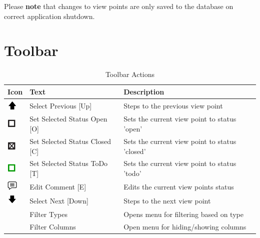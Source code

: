 Please \textbf{note} that changes to view points are only saved to the database on correct application shutdown.

\section{Toolbar}

\begin{table}[H]
  \center
  \begin{tabular}{ | l | l | l |}
    \hline
    \textbf{Icon} & \textbf{Text} &  \textbf{Description} \\ \hline
    \includegraphics[width=0.5cm,frame]{../../data/icons/up.png} & Select Previous [Up] & Steps to the previous view point \\ \hline
    \includegraphics[width=0.5cm,frame]{../../data/icons/not_recommended.png} & Set Selected Status Open [O] & Sets the current view point to status 'open' \\ \hline
    \includegraphics[width=0.5cm,frame]{../../data/icons/not_todo.png} & Set Selected Status Closed [C] & Sets the current view point to status 'closed' \\ \hline
    \includegraphics[width=0.5cm,frame]{../../data/icons/todo.png} & Set Selected Status ToDo [T] & Sets the current view point to status 'todo' \\ \hline
    \includegraphics[width=0.5cm,frame]{../../data/icons/comment.png} & Edit Comment [E] & Edits the current view points status \\ \hline
    \includegraphics[width=0.5cm,frame]{../../data/icons/down.png} & Select Next [Down] & Steps to the next view point \\ \hline
    & Filter Types & Opens menu for filtering based on type \\ \hline
    & Filter Columns & Open menu for hiding/showing columns \\ \hline    
  \end{tabular}
  \caption{Toolbar Actions}
\end{table}
\ \\


